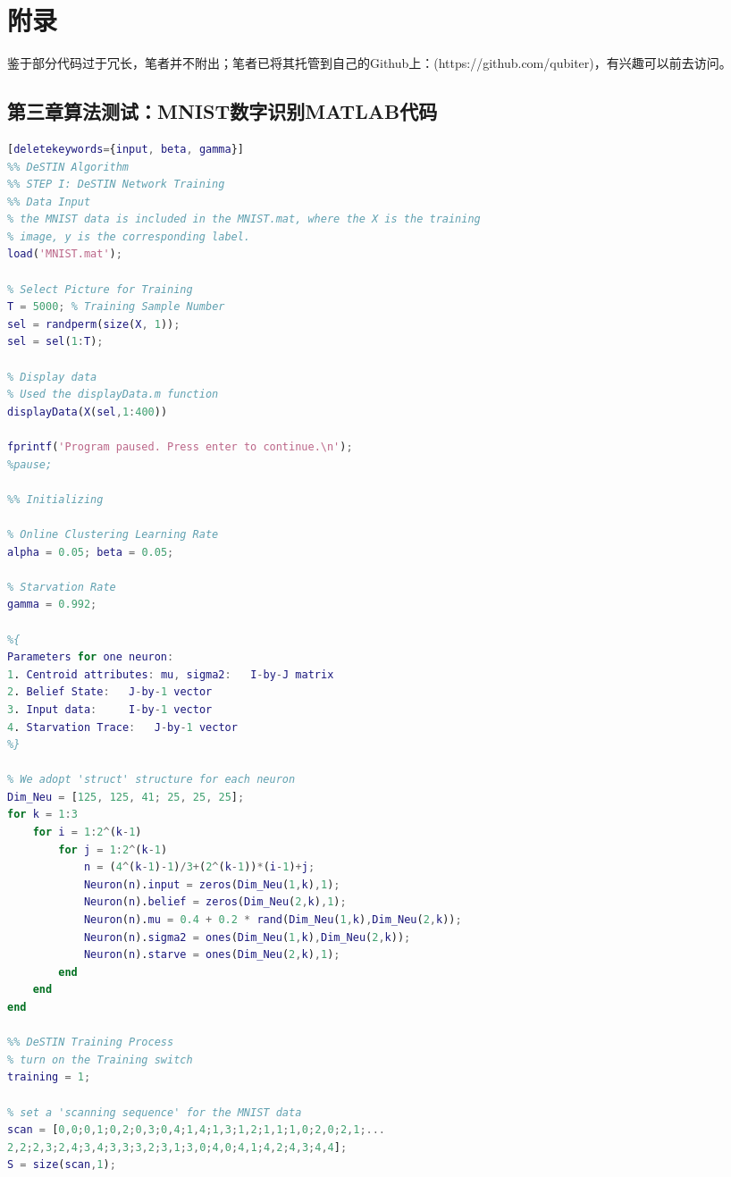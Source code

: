 \chapter{附录}\label{chapter_appendix}
\graphicspath{{chapter5/figure/}}

鉴于部分代码过于冗长，笔者并不附出；笔者已将其托管到自己的Github上：(https://github.com/qubiter)，有兴趣可以前去访问。

\section{第三章算法测试：MNIST数字识别MATLAB代码}
\begin{spacing}{1}
\begin{lstlisting}[language=Matlab][deletekeywords={input, beta, gamma}]
%% DeSTIN Algorithm
%% STEP I: DeSTIN Network Training
%% Data Input
% the MNIST data is included in the MNIST.mat, where the X is the training
% image, y is the corresponding label.
load('MNIST.mat');

% Select Picture for Training
T = 5000; % Training Sample Number
sel = randperm(size(X, 1));
sel = sel(1:T);

% Display data
% Used the displayData.m function
displayData(X(sel,1:400))

fprintf('Program paused. Press enter to continue.\n');
%pause;

%% Initializing

% Online Clustering Learning Rate
alpha = 0.05; beta = 0.05;

% Starvation Rate
gamma = 0.992;

%{
Parameters for one neuron: 
1. Centroid attributes: mu, sigma2:   I-by-J matrix
2. Belief State:   J-by-1 vector
3. Input data:     I-by-1 vector
4. Starvation Trace:   J-by-1 vector
%}

% We adopt 'struct' structure for each neuron
Dim_Neu = [125, 125, 41; 25, 25, 25];
for k = 1:3
    for i = 1:2^(k-1)
        for j = 1:2^(k-1)
            n = (4^(k-1)-1)/3+(2^(k-1))*(i-1)+j;
            Neuron(n).input = zeros(Dim_Neu(1,k),1);
            Neuron(n).belief = zeros(Dim_Neu(2,k),1);
            Neuron(n).mu = 0.4 + 0.2 * rand(Dim_Neu(1,k),Dim_Neu(2,k));
            Neuron(n).sigma2 = ones(Dim_Neu(1,k),Dim_Neu(2,k));
            Neuron(n).starve = ones(Dim_Neu(2,k),1);
        end
    end
end

%% DeSTIN Training Process
% turn on the Training switch
training = 1;

% set a 'scanning sequence' for the MNIST data
scan = [0,0;0,1;0,2;0,3;0,4;1,4;1,3;1,2;1,1;1,0;2,0;2,1;...
2,2;2,3;2,4;3,4;3,3;3,2;3,1;3,0;4,0;4,1;4,2;4,3;4,4];
S = size(scan,1);
  

\end{lstlisting}
\end{spacing}
